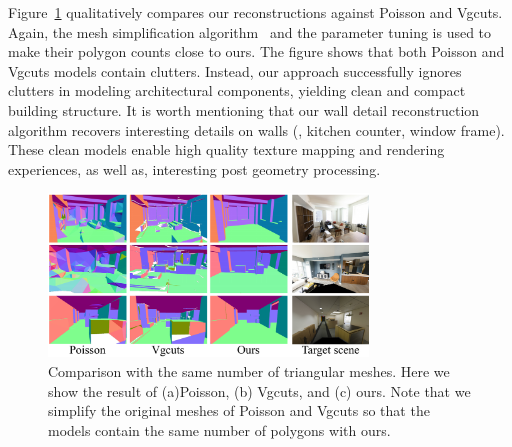 Figure~\ref{fig:comp_samemesh} qualitatively compares our
reconstructions against Poisson and Vgcuts. Again, the mesh
simplification algorithm~\cite{Tarini2010} and the parameter tuning is
used to make their polygon counts close to ours. The figure shows that
both Poisson and Vgcuts models contain clutters. Instead, our approach
successfully ignores clutters in modeling architectural components,
yielding clean and compact building structure. It is worth mentioning
that our wall detail reconstruction algorithm recovers interesting
details on walls (\eg, kitchen counter, window frame).
%
These clean models enable high quality texture mapping and rendering experiences, as well as,
interesting post geometry processing.
\begin{figure}[!t]
\begin{center}
\includegraphics[width=85mm]{../figures/comp_samemesh.pdf}
\end{center}
 \vspace{-0.3cm}
\caption{Comparison with the same number of triangular meshes. Here we show the result of (a)Poisson, (b) Vgcuts, and (c) ours. Note that we simplify the original meshes of Poisson and Vgcuts so that the models contain the same number of polygons with ours.}
\label{fig:comp_samemesh}
 \vspace{-0.25cm}
\end{figure}

